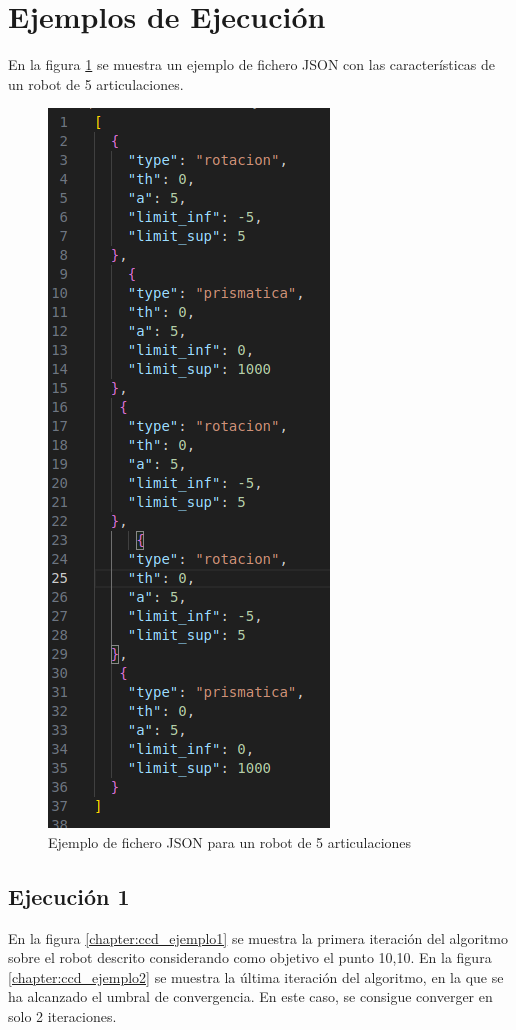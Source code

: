 \section{Ejemplos de Ejecución}
En la figura \ref{chapter:ccd_json2} se muestra un ejemplo de fichero JSON con las características de un robot de 5 articulaciones.
\begin{figure}[htb]
   \centering
   \includegraphics[width=.4\linewidth]{images/ccd_json2.png}
   \caption{Ejemplo de fichero JSON para un robot de 5 articulaciones}
   \label{chapter:ccd_json2}
\end{figure}

\subsection{Ejecución 1}
En la figura \ref{chapter:ccd_ejemplo1} se muestra la primera iteración del algoritmo sobre el robot descrito considerando como objetivo el punto 10,10.
En la figura \ref{chapter:ccd_ejemplo2} se muestra la última iteración del algoritmo, en la que se ha alcanzado el umbral de convergencia. En este caso, se consigue converger en solo 2 iteraciones.


